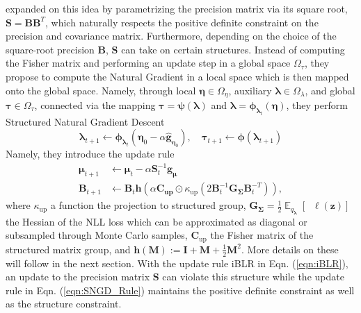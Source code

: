 \documentclass[a4paper, 11pt, oneside]{scrartcl}
\theoremstyle{break}
\DeclareMathOperator{\Expect}{\mathbb{E}}
\DeclareMathOperator{\Hessian}{\nabla^2}
\newcommand{\matr}[1]{\boldsymbol{#1}}
\numberwithin{equation}{section}
\begin{document}
		\parencite{LNK+21} expanded on this idea by parametrizing the precision matrix via its square root, $\matr{S} = \matr{B} \matr{B}^T$, which naturally respects the positive definite constraint on the precision and covariance matrix.
		Furthermore, depending on the choice of the square-root precision $\matr{B}$, $\matr{S}$ can take on certain structures.
		Instead of computing the Fisher matrix and performing an update step in a global space $\Omega_{\tau}$, they propose to compute the Natural Gradient in a local space which is then mapped onto the global space. 
		Namely, through local $\matr{\eta} \in \Omega_{\eta}$, auxiliary $\matr{\lambda} \in \Omega_{\lambda}$, and global $\matr{\tau} \in \Omega_{\tau}$, connected via the mapping $\matr{\tau} = \matr{\psi}(\matr{\lambda})$ and $\matr{\lambda} = \matr{\phi}_{\matr{\lambda}_t} (\matr{\eta})$, they perform Structured Natural Gradient Descent 
		\begin{equation}
			\matr{\lambda}_{t+1} \leftarrow \matr{\phi}_{\matr{\lambda}_t} \left( \matr{\eta}_0 - \alpha \matr{\hat{g}}_{\matr{\eta}_0} \right), \quad \matr{\tau}_{t+1} \leftarrow \matr{\phi} (\matr{\lambda}_{t+1})
		\end{equation}
		Namely, they introduce the update rule 
		\begin{equation}
			\begin{aligned}
				\matr{\mu}_{t+1} &\leftarrow \matr{\mu}_t - \alpha \matr{S}_t^{-1} \matr{g}_{\matr{\mu}} \\
				\matr{B}_{t+1} &\leftarrow \matr{B}_t \matr{h} \left( \alpha \matr{C_{\text{up}}} \odot \kappa_{\text{up}} (2 \matr{B}_t^{-1} \matr{G}_{\matr{\Sigma}} \matr{B}_t^{-T}) \right),
			\end{aligned}
			\label{eqn:SNGD_Rule}
		\end{equation}
		where $\kappa_{\text{up}}$ a function the projection to structured group, $\matr{G}_{\matr{\Sigma}} = \frac{1}{2} \Expect_{q_{\matr{\lambda}}} [\Hessian \ell (\matr{z})]$ the Hessian of the NLL loss which can be approximated as diagonal or subsampled through Monte Carlo samples, $\matr{C}_{\text{up}}$ the Fisher matrix of the structured matrix group, and $\matr{h} (\matr{M}) := \matr{I} + \matr{M} + \frac{1}{2} \matr{M}^2$.
		More details on these will follow in the next section. 
		With the update rule iBLR in Eqn. (\ref{eqn:iBLR}), an update to the precision matrix $\matr{S}$ can violate this structure while the update rule in Eqn. (\ref{eqn:SNGD_Rule}) maintains the positive definite constraint as well as the structure constraint. 
\end{document}
